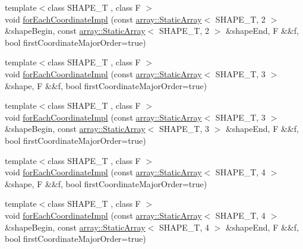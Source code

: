 \begin{DoxyCompactItemize}
\item 
{\footnotesize template$<$class S\+H\+A\+P\+E\+\_\+T , class F $>$ }\\void \hyperlink{namespacenifty_1_1tools_a4d10b12dbebf89f9ad6f38e644547778}{for\+Each\+Coordinate\+Impl} (const \hyperlink{namespacenifty_1_1array_a683f151f19c851754e0c6d55ed16a0c2}{array\+::\+Static\+Array}$<$ S\+H\+A\+P\+E\+\_\+T, 2 $>$ \&shape\+Begin, const \hyperlink{namespacenifty_1_1array_a683f151f19c851754e0c6d55ed16a0c2}{array\+::\+Static\+Array}$<$ S\+H\+A\+P\+E\+\_\+T, 2 $>$ \&shape\+End, F \&\&f, bool first\+Coordinate\+Major\+Order=true)
\item 
{\footnotesize template$<$class S\+H\+A\+P\+E\+\_\+T , class F $>$ }\\void \hyperlink{namespacenifty_1_1tools_ade659d2c15de2ffed10783e9f1602e59}{for\+Each\+Coordinate\+Impl} (const \hyperlink{namespacenifty_1_1array_a683f151f19c851754e0c6d55ed16a0c2}{array\+::\+Static\+Array}$<$ S\+H\+A\+P\+E\+\_\+T, 3 $>$ \&shape, F \&\&f, bool first\+Coordinate\+Major\+Order=true)
\item 
{\footnotesize template$<$class S\+H\+A\+P\+E\+\_\+T , class F $>$ }\\void \hyperlink{namespacenifty_1_1tools_a0d8157dba40263adc2077ffac352ff76}{for\+Each\+Coordinate\+Impl} (const \hyperlink{namespacenifty_1_1array_a683f151f19c851754e0c6d55ed16a0c2}{array\+::\+Static\+Array}$<$ S\+H\+A\+P\+E\+\_\+T, 3 $>$ \&shape\+Begin, const \hyperlink{namespacenifty_1_1array_a683f151f19c851754e0c6d55ed16a0c2}{array\+::\+Static\+Array}$<$ S\+H\+A\+P\+E\+\_\+T, 3 $>$ \&shape\+End, F \&\&f, bool first\+Coordinate\+Major\+Order=true)
\item 
{\footnotesize template$<$class S\+H\+A\+P\+E\+\_\+T , class F $>$ }\\void \hyperlink{namespacenifty_1_1tools_a581fe3925f44b138d984f032f007ea30}{for\+Each\+Coordinate\+Impl} (const \hyperlink{namespacenifty_1_1array_a683f151f19c851754e0c6d55ed16a0c2}{array\+::\+Static\+Array}$<$ S\+H\+A\+P\+E\+\_\+T, 4 $>$ \&shape, F \&\&f, bool first\+Coordinate\+Major\+Order=true)
\item 
{\footnotesize template$<$class S\+H\+A\+P\+E\+\_\+T , class F $>$ }\\void \hyperlink{namespacenifty_1_1tools_aad393bfeb324d5a484bb50a2dd0ac9fa}{for\+Each\+Coordinate\+Impl} (const \hyperlink{namespacenifty_1_1array_a683f151f19c851754e0c6d55ed16a0c2}{array\+::\+Static\+Array}$<$ S\+H\+A\+P\+E\+\_\+T, 4 $>$ \&shape\+Begin, const \hyperlink{namespacenifty_1_1array_a683f151f19c851754e0c6d55ed16a0c2}{array\+::\+Static\+Array}$<$ S\+H\+A\+P\+E\+\_\+T, 4 $>$ \&shape\+End, F \&\&f, bool first\+Coordinate\+Major\+Order=true)

\end{DoxyCompactItemize}
